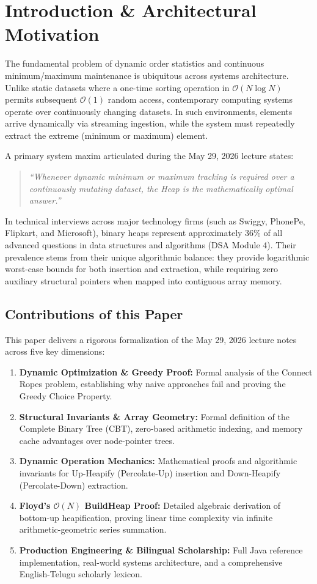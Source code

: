 \documentclass[10pt,twocolumn,letterpaper]{article}
\begin{document}
\section{Introduction \& Architectural Motivation}
\label{sec:intro}

The fundamental problem of dynamic order statistics and continuous minimum/maximum maintenance is ubiquitous across systems architecture. Unlike static datasets where a one-time sorting operation in $\mathcal{O}(N \log N)$ permits subsequent $\mathcal{O}(1)$ random access, contemporary computing systems operate over continuously changing datasets. In such environments, elements arrive dynamically via streaming ingestion, while the system must repeatedly extract the extreme (minimum or maximum) element. 

A primary system maxim articulated during the May 29, 2026 lecture states:
\begin{quote}
\itshape ``Whenever dynamic minimum or maximum tracking is required over a continuously mutating dataset, the Heap is the mathematically optimal answer.''
\end{quote}

In technical interviews across major technology firms (such as Swiggy, PhonePe, Flipkart, and Microsoft), binary heaps represent approximately 36\% of all advanced questions in data structures and algorithms (DSA Module 4). Their prevalence stems from their unique algorithmic balance: they provide logarithmic worst-case bounds for both insertion and extraction, while requiring zero auxiliary structural pointers when mapped into contiguous array memory.

\subsection{Contributions of this Paper}
This paper delivers a rigorous formalization of the May 29, 2026 lecture notes across five key dimensions:
\begin{enumerate}
    \item \textbf{Dynamic Optimization \& Greedy Proof:} Formal analysis of the Connect Ropes problem, establishing why naive approaches fail and proving the Greedy Choice Property.
    \item \textbf{Structural Invariants \& Array Geometry:} Formal definition of the Complete Binary Tree (CBT), zero-based arithmetic indexing, and memory cache advantages over node-pointer trees.
    \item \textbf{Dynamic Operation Mechanics:} Mathematical proofs and algorithmic invariants for Up-Heapify (Percolate-Up) insertion and Down-Heapify (Percolate-Down) extraction.
    \item \textbf{Floyd's $\mathcal{O}(N)$ BuildHeap Proof:} Detailed algebraic derivation of bottom-up heapification, proving linear time complexity via infinite arithmetic-geometric series summation.
    \item \textbf{Production Engineering \& Bilingual Scholarship:} Full Java reference implementation, real-world systems architecture, and a comprehensive English-Telugu scholarly lexicon.
\end{enumerate}
\end{document}
